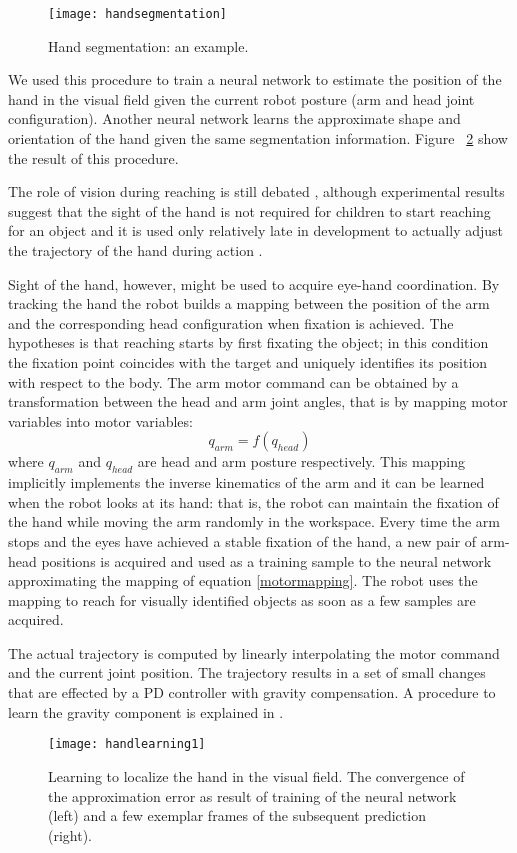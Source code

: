 \begin{figure}
\centering
\texttt{[image: handsegmentation]}
\caption{Hand segmentation: an example.}
\label{fig-handsegmentation}
\end{figure}

We used this procedure to train a neural network to estimate the position of the hand in the visual field given the current robot posture (arm and head joint configuration). Another neural network learns the approximate shape and orientation of the hand given the same segmentation information. Figure ~\ref{sec-handlearning1} show the result of this procedure. 

The role of vision during reaching is still debated \cite{saunders03humans}, although experimental results suggest that the sight of the hand is not required for children to start reaching for an object \cite{clifton93isvisually,clifton94multimodal} and it is used only relatively late in development to actually adjust the trajectory of the hand during action \cite{ashmead93visual}. 

Sight of the hand, however, might be used to acquire eye-hand coordination. By tracking the hand the robot builds a mapping between the position of the arm and the corresponding head configuration when fixation is achieved. The hypotheses is that reaching starts by first fixating the object; in this condition the fixation point coincides with the target and uniquely identifies its position with respect to the body. The arm motor command can be obtained by a transformation between the head and arm joint angles, that is by mapping motor variables into motor variables:
\begin{equation}q_{arm}=f(q_{head})\label{motormapping}\end{equation}
\noindent where $q_{arm}$ and $q_{head}$ are head and arm posture respectively. This mapping implicitly implements the inverse kinematics of the arm and it can be learned when the robot looks at its hand: that is, the robot can maintain the fixation of the hand while moving the arm randomly in the workspace. Every time the arm stops and the eyes have achieved a stable fixation of the hand, a new pair of arm-head positions is acquired and used as a training sample to the neural network approximating the mapping of equation \ref{motormapping}. The robot uses the mapping to reach for visually identified objects as soon as a few samples are acquired.

The actual trajectory is computed by linearly interpolating the motor command and the current joint position. The trajectory results in a set of small changes that are effected by a PD controller with gravity compensation. A procedure to learn the gravity component is explained in \cite{natale04thesis}.

\begin{figure}
\centering
\texttt{[image: handlearning1]}
\caption{Learning to localize the hand in the visual field. The convergence of the approximation error as result of training of the neural network (left) and a few exemplar frames of the subsequent prediction (right).}
\label{sec-handlearning1}
\end{figure}

